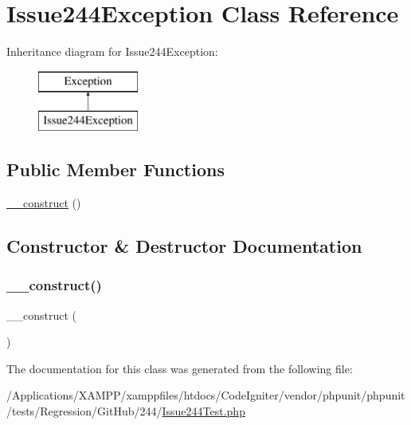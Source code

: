 \hypertarget{class_issue244_exception}{}\section{Issue244\+Exception Class Reference}
\label{class_issue244_exception}
Inheritance diagram for Issue244\+Exception\+:\begin{figure}[H]
\begin{center}
\leavevmode
\includegraphics[height=2.000000cm]{class_issue244_exception}
\end{center}
\end{figure}
\subsection*{Public Member Functions}
\begin{DoxyCompactItemize}
\item 
\mbox{\hyperlink{class_issue244_exception_a095c5d389db211932136b53f25f39685}{\+\_\+\+\_\+construct}} ()
\end{DoxyCompactItemize}


\subsection{Constructor \& Destructor Documentation}
\mbox{\label{class_issue244_exception_a095c5d389db211932136b53f25f39685}} 
\subsubsection{\texorpdfstring{\+\_\+\+\_\+construct()}{\_\_construct()}}
{\footnotesize\ttfamily \+\_\+\+\_\+construct (\begin{DoxyParamCaption}{ }\end{DoxyParamCaption})}



The documentation for this class was generated from the following file\+:\begin{DoxyCompactItemize}
\item 
/\+Applications/\+X\+A\+M\+P\+P/xamppfiles/htdocs/\+Code\+Igniter/vendor/phpunit/phpunit/tests/\+Regression/\+Git\+Hub/244/\mbox{\hyperlink{_issue244_test_8php}{Issue244\+Test.\+php}}\end{DoxyCompactItemize}
